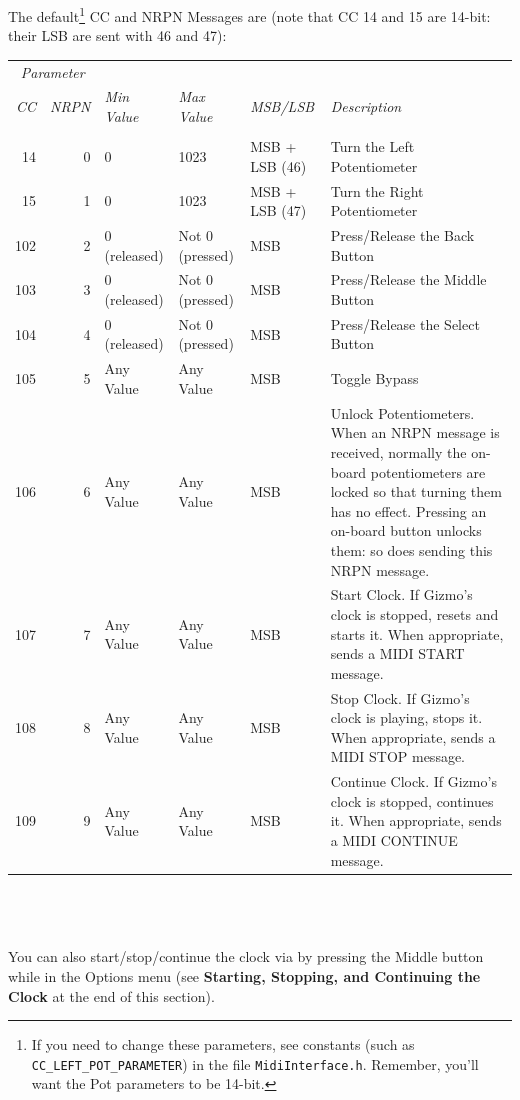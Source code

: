 \documentclass{article}
\begin{document}
\begin{description}
		The default\footnote{If you need to change these parameters, see constants (such as \texttt{CC\_LEFT\_POT\_PARAMETER}) in the file \texttt{MidiInterface.h}.  Remember, you'll want the Pot parameters to be 14-bit.} CC and NRPN Messages are (note that CC 14 and 15 are 14-bit: their LSB are sent with 46 and 47):
		
		\noindent\hspace{-1.5em}\begin{tabular}{@{}rr|lllp{2.4in}@{}}
		\multicolumn{2}{c}{\it Parameter}\\
		{\it CC}&{\it \hspace{-0.8em} NRPN}&{\it Min  Value}&{\it Max Value}&{\it MSB/LSB}&{\it Description}\\[0.1em]
		\hline\\[-0.9em]
		14&0	&0	& 1023 & MSB + LSB (46)& Turn the Left Potentiometer\\
		15&1	&0	& 1023 & MSB + LSB (47) & Turn the Right Potentiometer\\
		102&2	&0 (released)	&Not 0 (pressed) & MSB& Press/Release the Back Button\\
		103&3	&0 (released)	&Not 0  (pressed) & MSB & Press/Release the Middle Button\\
		104&4	&0 (released)	&Not 0 (pressed) & MSB & Press/Release the Select Button\\
		105&5	&Any Value	&Any Value & MSB& Toggle Bypass\\
		106&6	& Any Value &Any Value & MSB& Unlock Potentiometers.  When an NRPN message is received, normally the on-board potentiometers are locked so that turning them has no effect.  Pressing an on-board button unlocks them: so does sending this NRPN message.\\
		107&7	&	Any Value &Any Value & MSB& Start Clock.  If Gizmo's clock is stopped, resets and starts it.  When appropriate, sends a MIDI START message.\\
		108&8	& Any Value	&Any Value & MSB& Stop Clock.  If Gizmo's clock is playing, stops it.  When appropriate, sends a MIDI STOP message.\\
		109&9	&	Any Value &Any Value & MSB & Continue Clock.    If Gizmo's clock is stopped, continues it.  When appropriate, sends a MIDI CONTINUE message.\\
		\end{tabular}\\
		\\
		\\
		You can also start/stop/continue the clock via by pressing the Middle button while in the Options menu (see {\bf Starting, Stopping, and Continuing the Clock} at the end of this section).
		

\end{description}
\end{document}
